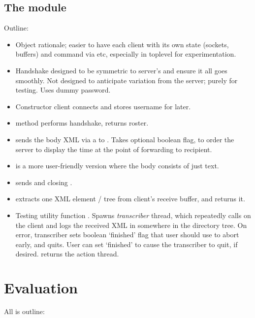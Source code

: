 \documentclass[12pt,a4paper,twoside,openright]{report}
\begin{document}
{\section{The  module}
Outline:

\begin{itemize}
  \item Object rationale; easier to have each client with its own state (sockets, buffers) and command via  etc, especially in toplevel for experimentation.

  \item Handshake designed to be symmetric to server's and ensure it all goes smoothly. Not designed to anticipate variation from the server; purely for testing. Uses dummy password.

  \item Constructor client connects and stores username for later.

  \item {} method performs handshake, returns roster.

  \item {} sends the body XML via a  to . Takes optional  boolean flag, to order the server to display the time at the point of forwarding to recipient.

  \item {} is a more user-friendly version where the body consists of just text.

  \item {} sends  and closing .

  \item {} extracts one XML element / tree from client's receive buffer, and returns it.

  \item Testing utility function . Spawns \emph{transcriber} thread, which repeatedly calls  on the client and logs the received XML in  somewhere in the  directory tree. On error, transcriber sets boolean `finished' flag that user should use to abort early, and quits. User can set `finished' to cause the transcriber to quit, if desired.  returns the action thread.
\end{itemize}


\chapter{Evaluation}
All is outline:

}
\end{document}
